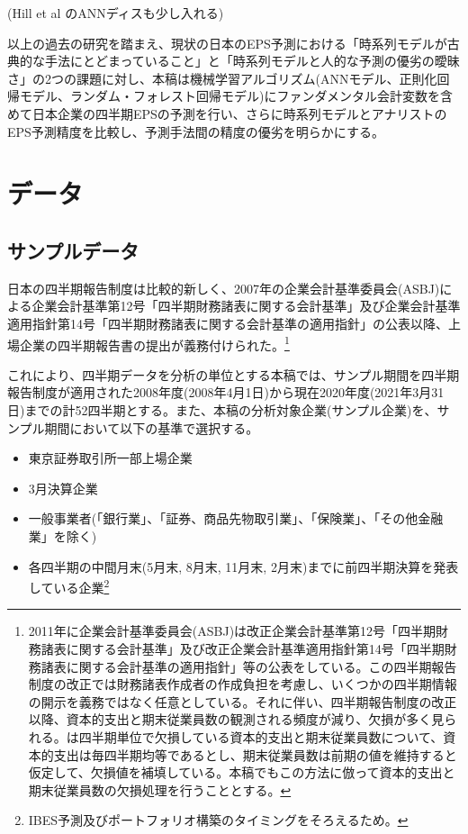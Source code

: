 \documentclass[a4paper, 12pt]{jsreport}
\begin{document}
(Hill et al のANNディスも少し入れる)

以上の過去の研究を踏まえ、現状の日本のEPS予測における「時系列モデルが古典的な手法にとどまっていること」と「時系列モデルと人的な予測の優劣の曖昧さ」の2つの課題に対し、本稿は機械学習アルゴリズム(ANNモデル、正則化回帰モデル、ランダム・フォレスト回帰モデル)にファンダメンタル会計変数を含めて日本企業の四半期EPSの予測を行い、さらに時系列モデルとアナリストのEPS予測精度を比較し、予測手法間の精度の優劣を明らかにする。

\chapter{データ}

\section{サンプルデータ}

日本の四半期報告制度は比較的新しく、2007年の企業会計基準委員会(ASBJ)による企業会計基準第12号「四半期財務諸表に関する会計基準」及び企業会計基準適用指針第14号「四半期財務諸表に関する会計基準の適用指針」の公表以降、上場企業の四半期報告書の提出が義務付けられた。\footnote{2011年に企業会計基準委員会(ASBJ)は改正企業会計基準第12号「四半期財務諸表に関する会計基準」及び改正企業会計基準適用指針第14号「四半期財務諸表に関する会計基準の適用指針」等の公表をしている。この四半期報告制度の改正では財務諸表作成者の作成負担を考慮し、いくつかの四半期情報の開示を義務ではなく任意としている。それに伴い、四半期報告制度の改正以降、資本的支出と期末従業員数の観測される頻度が減り、欠損が多く見られる。\cite{zhang2004neural}は四半期単位で欠損している資本的支出と期末従業員数について、資本的支出は毎四半期均等であるとし、期末従業員数は前期の値を維持すると仮定して、欠損値を補填している。本稿でもこの方法に倣って資本的支出と期末従業員数の欠損処理を行うこととする。}

これにより、四半期データを分析の単位とする本稿では、サンプル期間を四半期報告制度が適用された2008年度(2008年4月1日)から現在2020年度(2021年3月31日)までの計52四半期とする。また、本稿の分析対象企業(サンプル企業)を、サンプル期間において以下の基準で選択する。

\begin{itemize}
  \item 東京証券取引所一部上場企業
  \item 3月決算企業
  \item 一般事業者(「銀行業」、「証券、商品先物取引業」、「保険業」、「その他金融業」を除く)
  \item 各四半期の中間月末(5月末, 8月末, 11月末, 2月末)までに前四半期決算を発表している企業\footnote{IBES予測及びポートフォリオ構築のタイミングをそろえるため。}
\end{itemize}
\end{document}
